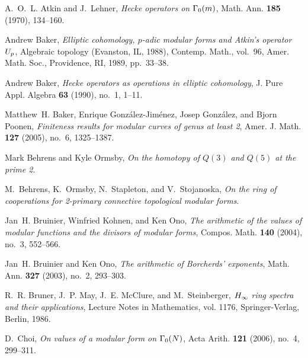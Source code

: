 \documentclass{gtpart}
\theoremstyle{definition}
\theoremstyle{remark}
\renewcommand{\=}{\approx}
\renewcommand{\-}{\sim}
\numberwithin{equation}{section}
\begin{document}
\begin{thebibliography}
A.~O.~L. Atkin and J.~Lehner, \emph{Hecke operators on {$\Gamma \sb{0}(m)$}},
  Math. Ann. \textbf{185} (1970), 134--160. 

Andrew Baker, \emph{Elliptic cohomology, {$p$}-adic modular forms and {A}tkin's
  operator {$U\sb p$}}, Algebraic topology ({E}vanston, {IL}, 1988), Contemp.
  Math., vol.~96, Amer. Math. Soc., Providence, RI, 1989, pp.~33--38.

Andrew Baker, \emph{Hecke operators as operations in elliptic cohomology}, J. 
  Pure Appl. Algebra \textbf{63} (1990), no.~1, 1--11. 

Matthew~H. Baker, Enrique Gonz{\'a}lez-Jim{\'e}nez, Josep Gonz{\'a}lez, and
  Bjorn Poonen, \emph{Finiteness results for modular curves of genus at least
  2}, Amer. J. Math. \textbf{127} (2005), no.~6, 1325--1387. 

Mark Behrens and Kyle Ormsby, \emph{On the homotopy of {$Q(3)$} and {$Q(5)$} at
  the prime 2}.  

M.~Behrens, K.~Ormsby, N.~Stapleton, and V.~Stojanoska, \emph{On the ring of
  cooperations for 2-primary connective topological modular forms}. 

Jan~H. Bruinier, Winfried Kohnen, and Ken Ono, \emph{The arithmetic of the
  values of modular functions and the divisors of modular forms}, Compos. Math.
  \textbf{140} (2004), no.~3, 552--566. 

Jan~H. Bruinier and Ken Ono, \emph{The arithmetic of {B}orcherds' exponents},
  Math. Ann. \textbf{327} (2003), no.~2, 293--303. 

R.~R. Bruner, J.~P. May, J.~E. McClure, and M.~Steinberger, \emph{{$H\sb \infty
  $} ring spectra and their applications}, Lecture Notes in Mathematics, vol.
  1176, Springer-Verlag, Berlin, 1986. 

D.~Choi, \emph{On values of a modular form on {$\Gamma\sb 0(N)$}}, Acta Arith.
  \textbf{121} (2006), no.~4, 299--311. 


\end{thebibliography}
\end{document}
